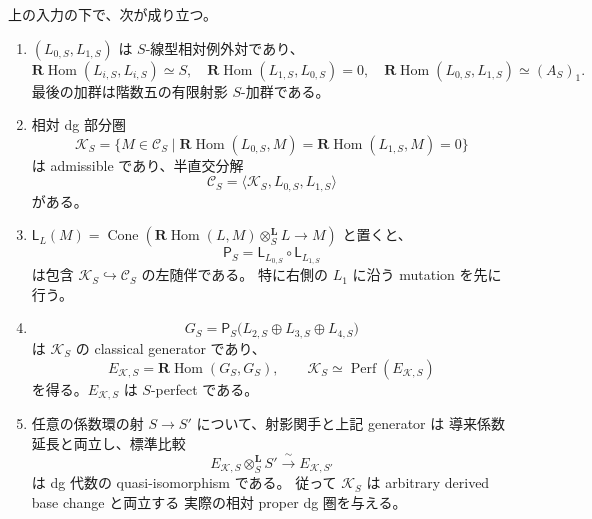 \begin{theorem}[任意係数上の相対残余圏]
\label{thm:relative-kuznetsov-projector}
上の入力の下で、次が成り立つ。
\begin{enumerate}
\item $(L_{0,S},L_{1,S})$ は $S$-線型相対例外対であり、
\[
 \mathbf R\operatorname{Hom}(L_{i,S},L_{i,S})\simeq S,
 \quad\mathbf R\operatorname{Hom}(L_{1,S},L_{0,S})=0,
 \quad\mathbf R\operatorname{Hom}(L_{0,S},L_{1,S})\simeq (A_S)_1.
\]
最後の加群は階数五の有限射影 $S$-加群である。
\item 相対 dg 部分圏
\[
 \mathcal K_S=\{M\in\mathcal C_S\mid
  \mathbf R\operatorname{Hom}(L_{0,S},M)=
  \mathbf R\operatorname{Hom}(L_{1,S},M)=0\}
\]
は admissible であり、半直交分解
\begin{equation}\label{eq:relative-kuznetsov-sod}
 \mathcal C_S=\langle\mathcal K_S,L_{0,S},L_{1,S}\rangle
\end{equation}
がある。
\item $\mathsf L_L(M)=\operatorname{Cone}
 (\mathbf R\operatorname{Hom}(L,M)\otimes_S^{\mathbf L}L\to M)$
と置くと、
\begin{equation}\label{eq:relative-kuznetsov-left-projector}
 \mathsf P_S=\mathsf L_{L_{0,S}}\circ\mathsf L_{L_{1,S}}
\end{equation}
は包含 $\mathcal K_S\hookrightarrow\mathcal C_S$ の左随伴である。
特に右側の $L_1$ に沿う mutation を先に行う。
\item
\begin{equation}\label{eq:relative-kuznetsov-generator}
 G_S=\mathsf P_S\bigl(L_{2,S}\oplus L_{3,S}\oplus L_{4,S}\bigr)
\end{equation}
は $\mathcal K_S$ の classical generator であり、
\[
 E_{\mathcal K,S}=\mathbf R\operatorname{Hom}(G_S,G_S),
 \qquad\mathcal K_S\simeq\operatorname{Perf}(E_{\mathcal K,S})
\]
を得る。$E_{\mathcal K,S}$ は $S$-perfect である。
\item 任意の係数環の射 $S\to S'$ について、射影関手と上記 generator は
導来係数延長と両立し、標準比較
\[
 E_{\mathcal K,S}\otimes_S^{\mathbf L}S'
 \xrightarrow{\ \sim\ }E_{\mathcal K,S'}
\]
は dg 代数の quasi-isomorphism である。
従って $\mathcal K_S$ は arbitrary derived base change と両立する
実際の相対 proper dg 圏を与える。
\end{enumerate}
\end{theorem}

